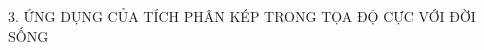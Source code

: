 \documentclass[preview]{standalone}
\begin{document}
\begin{center}
3. ỨNG DỤNG CỦA TÍCH PHÂN KÉP TRONG TỌA ĐỘ CỰC VỚI ĐỜI SỐNG
\end{center}
\end{document}

